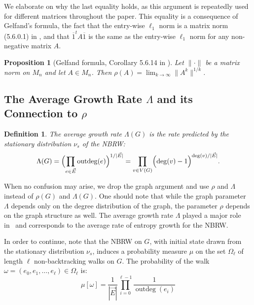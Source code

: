 \documentclass{article}
\newtheorem{definition}[theorem]{Definition}
\newtheorem{proposition}[theorem]{Proposition}
\newcommand{\dirE}{\vec{E}}
\DeclareMathOperator{\outdeg}{outdeg}
\begin{document}
We elaborate on why the last equality holds, as this argument is repeatedly used for different matrices throughout the paper. This equality is a consequence of Gelfand's formula, the fact that the entry-wise $\ell_1$ norm is a matrix norm (5.6.0.1) in \cite{horn2012matrix}, and that $\overline{1}^t A \overline{1}$ is the same as the entry-wise $\ell_1$ norm for any non-negative matrix $A$.
\begin{proposition}[Gelfand formula, Corollary 5.6.14 in \cite{horn2012matrix}]\label{proposition:Gelfand}
    Let $\| \cdot \|$ be a matrix norm on $M_n$ and let $A\in M_n$.
    Then $\rho(A)=\lim_{k\to\infty}\|A^k\|^{1/k}$.
\end{proposition}


\subsection{The Average Growth Rate $\Lambda$ and its Connection to $\rho$}\label{subsection:Lambda}
\begin{definition}
   The average growth rate $\Lambda(G)$ is the rate predicted by the stationary distribution $\nu_s$ of the NBRW:
\begin{equation}\label{eq:Lambda}
    \Lambda(G) = \Bigl( \prod_{e \in \dirE} \outdeg(e) \Bigr)^{1/{|\dirE|}} = \prod_{v \in V(G)} \Bigl( \deg(v)-1 \Bigr)^{\deg(v)/{|\dirE|}}.
\end{equation} 
\end{definition}

When no confusion may arise, we drop the graph argument and use $\rho$ and $\Lambda$ instead of $\rho(G)$ and $\Lambda(G)$. 
One should note that while the graph parameter $\Lambda$ depends only on the degree distribution of the graph,
the parameter $\rho$ depends on the graph structure as well. 
The average growth rate $\Lambda$ played a major role in~\cite{alon2002moore,hoory2002size} 
and corresponds to the average rate of entropy growth for the NBRW.

In order to continue, note that the NBRW on $G$, with initial state drawn from the stationary distribution $\nu_s$, 
induces a probability measure $\mu$ on the set $\Omega_\ell$ of length $\ell$ non-backtracking walks on $G$. 
The probability of the walk $\omega = (e_0,e_1,\ldots,e_\ell)\in \Omega_\ell$ is: 
\begin{equation}
    \mu[\omega] = \frac{1}{|\dirE|} \prod_{i=0}^{\ell-1} \frac{1}{\outdeg(e_i)}
\end{equation}
\end{document}
